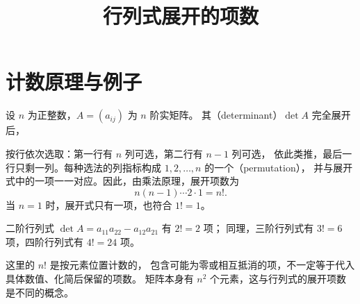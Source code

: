 \documentclass[UTF8,12pt,a4paper,fontset=fandol]{ctexart}
\title{行列式展开的项数}
\author{}
\date{}
\begin{document}
\maketitle

\section{计数原理与例子}

设 $n$ 为正整数，$A=(a_{ij})$ 为 $n$ 阶实矩阵。
其（determinant）$\det A$ 完全展开后，

按行依次选取：第一行有 $n$ 列可选，第二行有 $n-1$ 列可选，
依此类推，最后一行只剩一列。每种选法的列指标构成
$1,2,\ldots,n$ 的一个（permutation），
并与展开式中的一项一一对应。因此，由乘法原理，展开项数为
\begin{equation}
  \boxed{n(n-1)\cdots 2\cdot 1=n!}.
  \label{eq:determinant-term-count}
\end{equation}
当 $n=1$ 时，展开式只有一项，也符合 $1!=1$。

\begin{example}
二阶行列式 $\det A=a_{11}a_{22}-a_{12}a_{21}$ 有 $2!=2$ 项；
同理，三阶行列式有 $3!=6$ 项，四阶行列式有 $4!=24$ 项。
\end{example}

这里的 $n!$ 是按元素位置计数的，
包含可能为零或相互抵消的项，不一定等于代入具体数值、化简后保留的项数。
矩阵本身有 $n^2$ 个元素，这与行列式的展开项数是不同的概念。
\end{document}
